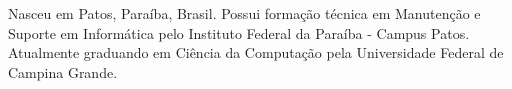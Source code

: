 \documentclass{classe_cn}                 %
\begin{document}
\vspace{1.0cm}
 Nasceu em Patos, Paraíba, Brasil. Possui formação técnica em Manutenção e Suporte em Informática pelo Instituto Federal da Paraíba - Campus Patos. Atualmente graduando em Ciência da Computação pela Universidade Federal de Campina Grande.



\end{document}
